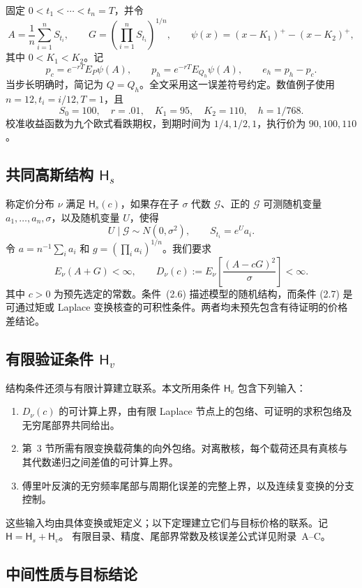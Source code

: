 固定 \(0<t_1<\cdots<t_n=T\)，并令
\[
A=\frac1n\sum_{i=1}^nS_{t_i},\qquad
G=\left(\prod_{i=1}^nS_{t_i}\right)^{1/n},\qquad
\psi(x)=(x-K_1)^+-(x-K_2)^+,
\tag{2.3}
\]
其中 \(0<K_1<K_2\)。记
\[
p_c=e^{-rT}E_P\psi(A),\qquad
p_h=e^{-rT}E_{Q_h}\psi(A),\qquad e_h=p_h-p_c.
\tag{2.4}
\]
当步长明确时，简记为 \(Q=Q_h\)。全文采用这一误差符号约定。数值例子使用 \(n=12,t_i=i/12,T=1\)，且
\[
S_0=100,\quad r=.01,\quad K_1=95,\quad K_2=110,\quad h=1/768.
\tag{2.5}
\]
校准收益函数为九个欧式看跌期权，到期时间为 \(1/4,1/2,1\)，执行价为 \(90,100,110\)。

\subsection{共同高斯结构 \(\mathsf H_s\)}

称定价分布 \(\nu\) 满足 \(\mathsf H_s(c)\)，如果存在子 \(\sigma\) 代数 \(\mathcal G\)、正的 \(\mathcal G\) 可测随机变量 \(a_1,\ldots,a_n,\sigma\)，以及随机变量 \(U\)，使得
\[
U\mid\mathcal G\sim N(0,\sigma^2),\qquad S_{t_i}=e^Ua_i.
\tag{2.6}
\]
令 \(a=n^{-1}\sum_i a_i\) 和 \(g=(\prod_i a_i)^{1/n}\)。我们要求
\[
E_\nu(A+G)<\infty,\qquad
D_\nu(c):=E_\nu\!\left[\frac{(A-cG)^2}{\sigma}\right]<\infty.
\tag{2.7}
\]
其中 \(c>0\) 为预先选定的常数。条件~(2.6) 描述模型的随机结构，而条件 (2.7) 是可通过矩或 Laplace 变换核查的可积性条件。两者均未预先包含有待证明的价格差结论。

\subsection{有限验证条件 \(\mathsf H_v\)}

结构条件还须与有限计算建立联系。本文所用条件 \(\mathsf H_v\) 包含下列输入：
\begin{enumerate}
\item \(D_\nu(c)\) 的可计算上界，由有限 Laplace 节点上的包络、可证明的求积包络及无穷尾部界共同给出。
\item 第~3 节所需有限变换载荷集的向外包络。对离散核，每个载荷还具有真核与其代数递归之间差值的可计算上界。
\item 傅里叶反演的无穷频率尾部与周期化误差的完整上界，以及连续复变换的分支控制。
\end{enumerate}
这些输入均由具体变换或矩定义；以下定理建立它们与目标价格的联系。记
\(\mathsf H=\mathsf H_s+\mathsf H_v\)。
有限目录、精度、尾部界常数及核误差公式详见附录~A--C。

\subsection{中间性质与目标结论}

